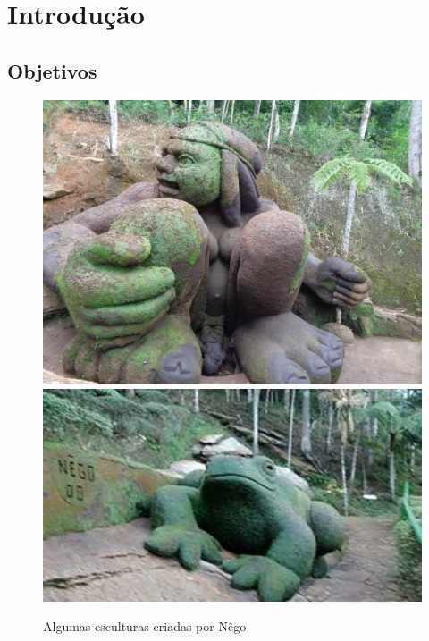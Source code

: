 \documentclass[table, usenames, svgnames, xcolor=dvipsnames]{beamer}
\begin{document}
\section{Introdução}


\subsection{Objetivos}
\begin{frame} 
	\begin{figure}[!h]
		\centering
		\includegraphics[width=0.45\linewidth]{figs/jardim-do-nego.jpg}
		\quad 
		\includegraphics[width=0.5\linewidth]{figs/jardim-do-nego32.jpg}
		\caption{%
			Algumas esculturas criadas por Nêgo 
		}
	\end{figure}
\end{frame}

%		
%
%
%		
\end{document}

